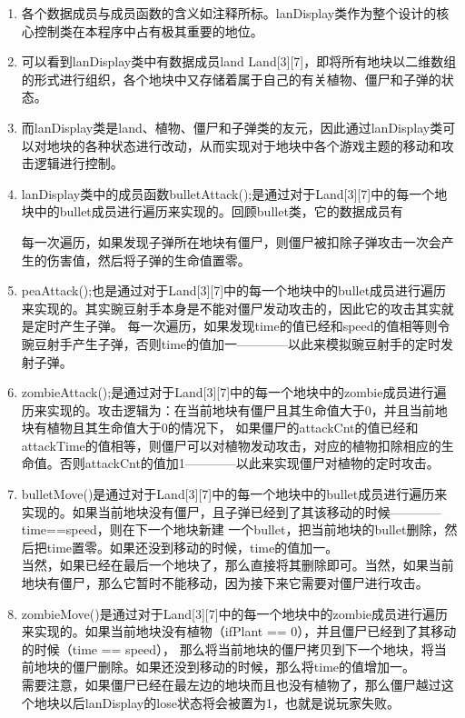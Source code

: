 \documentclass[12pt,a4paper,UTF8]{article}
\begin{document}
    \begin{enumerate}
      \item 各个数据成员与成员函数的含义如注释所标。lanDisplay类作为整个设计的核心控制类在本程序中占有极其重要的地位。
      \item 可以看到lanDisplay类中有数据成员land Land[3][7]，即将所有地块以二维数组的形式进行组织，各个地块中又存储着属于自己的有关植物、僵尸和子弹的状态。
      \item 而lanDisplay类是land、植物、僵尸和子弹类的友元，因此通过lanDisplay类可以对地块的各种状态进行改动，从而实现对于地块中各个游戏主题的移动和攻击逻辑进行控制。
      \item lanDisplay类中的成员函数bulletAttack();是通过对于Land[3][7]中的每一个地块中的bullet成员进行遍历来实现的。回顾bullet类，它的数据成员有
      
      每一次遍历，如果发现子弹所在地块有僵尸，则僵尸被扣除子弹攻击一次会产生的伤害值，然后将子弹的生命值置零。
      \item peaAttack();也是通过对于Land[3][7]中的每一个地块中的bullet成员进行遍历来实现的。其实豌豆射手本身是不能对僵尸发动攻击的，因此它的攻击其实就是定时产生子弹。
      每一次遍历，如果发现time的值已经和speed的值相等则令豌豆射手产生子弹，否则time的值加一————以此来模拟豌豆射手的定时发射子弹。
      \item zombieAttack();是通过对于Land[3][7]中的每一个地块中的zombie成员进行遍历来实现的。攻击逻辑为：在当前地块有僵尸且其生命值大于0，并且当前地块有植物且其生命值大于0的情况下，
      如果僵尸的attackCnt的值已经和attackTime的值相等，则僵尸可以对植物发动攻击，对应的植物扣除相应的生命值。否则attackCnt的值加1————以此来实现僵尸对植物的定时攻击。
      \item bulletMove()是通过对于Land[3][7]中的每一个地块中的bullet成员进行遍历来实现的。如果当前地块没有僵尸，且子弹已经到了其该移动的时候————time==speed，则在下一个地块新建
      一个bullet，把当前地块的bullet删除，然后把time置零。如果还没到移动的时候，time的值加一。\\
      当然，如果已经在最后一个地块了，那么直接将其删除即可。当然，如果当前地块有僵尸，那么它暂时不能移动，因为接下来它需要对僵尸进行攻击。
      \item zombieMove()是通过对于Land[3][7]中的每一个地块中的zombie成员进行遍历来实现的。如果当前地块没有植物（ifPlant == 0），并且僵尸已经到了其移动的时候（time == speed），
      那么将当前地块的僵尸拷贝到下一个地块，将当前地块的僵尸删除。如果还没到移动的时候，那么将time的值增加一。\\
      需要注意，如果僵尸已经在最左边的地块而且也没有植物了，那么僵尸越过这个地块以后lanDisplay的lose状态将会被置为1，也就是说玩家失败。
    \end{enumerate}
\end{document}
